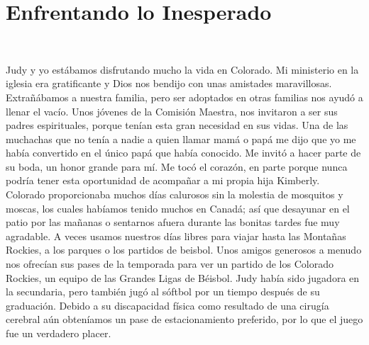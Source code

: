 \documentclass[twoside, 12pt]{book}
\begin{document}
\chapter{Enfrentando lo Inesperado}
\

Judy y yo estábamos disfrutando mucho la vida en Colorado. Mi ministerio en la iglesia era gratificante y Dios nos bendijo con unas amistades maravillosas. Extrañábamos a nuestra familia, pero ser adoptados en otras familias nos ayudó a llenar el vacío. Unos jóvenes de la Comisión Maestra, nos invitaron a ser sus padres espirituales, porque tenían esta gran necesidad en sus vidas. Una de las muchachas que no tenía a nadie a quien llamar mamá o papá me dijo que yo me había convertido en el único papá que había conocido. Me invitó a hacer parte de su boda, un honor grande para mí. Me tocó el corazón, en parte porque nunca podría tener esta oportunidad de acompañar a mi propia hija Kimberly.\\

Colorado proporcionaba muchos días calurosos sin la molestia de mosquitos y moscas, los cuales habíamos tenido muchos en Canadá; así que desayunar en el patio por las mañanas o sentarnos afuera durante las bonitas tardes fue muy agradable. A veces usamos nuestros días libres para viajar hasta las Montañas Rockies, a los parques o los partidos de beisbol. Unos amigos generosos a menudo nos ofrecían sus pases de la temporada para ver un partido de los Colorado Rockies, un equipo de las Grandes Ligas de Béisbol. Judy había sido jugadora en la secundaria, pero también jugó al sóftbol por un tiempo después de su graduación. Debido a su discapacidad física como resultado de una cirugía cerebral aún obteníamos un pase de estacionamiento preferido, por lo que el juego fue un verdadero placer.\\
\end{document}
